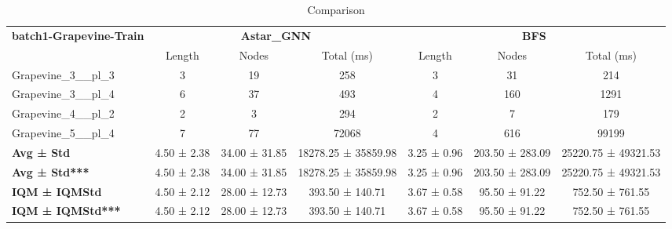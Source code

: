 \begin{table}[!ht]
\centering
\small
\begin{tabular}{l|ccc|ccc}
\multirow{2}{*}{\textbf{batch1-Grapevine-Train}} & \multicolumn{3}{c|}{\textbf{Astar\_GNN}} & \multicolumn{3}{c}{\textbf{BFS}} \\
\cline{2-7}
& Length & Nodes & Total (ms) & Length & Nodes & Total (ms) \\
\hline
Grapevine\_3\_\_pl\_3 & 3 & 19 & 258 & 3 & 31 & 214 \\
Grapevine\_3\_\_pl\_4 & 6 & 37 & 493 & 4 & 160 & 1291 \\
Grapevine\_4\_\_pl\_2 & 2 & 3 & 294 & 2 & 7 & 179 \\
Grapevine\_5\_\_pl\_4 & 7 & 77 & 72068 & 4 & 616 & 99199 \\
\hline
\textbf{Avg ± Std} & 4.50 ± 2.38 & 34.00 ± 31.85 & 18278.25 ± 35859.98 & 3.25 ± 0.96 & 203.50 ± 283.09 & 25220.75 ± 49321.53 \\
\textbf{Avg ± Std***} & 4.50 ± 2.38 & 34.00 ± 31.85 & 18278.25 ± 35859.98 & 3.25 ± 0.96 & 203.50 ± 283.09 & 25220.75 ± 49321.53 \\
\textbf{IQM ± IQMStd} & 4.50 ± 2.12 & 28.00 ± 12.73 & 393.50 ± 140.71 & 3.67 ± 0.58 & 95.50 ± 91.22 & 752.50 ± 761.55 \\
\textbf{IQM ± IQMStd***} & 4.50 ± 2.12 & 28.00 ± 12.73 & 393.50 ± 140.71 & 3.67 ± 0.58 & 95.50 ± 91.22 & 752.50 ± 761.55 \\
\end{tabular}
\caption{Comparison}
\label{tab:batch1_Grapevine_comparison_train}
\end{table}
